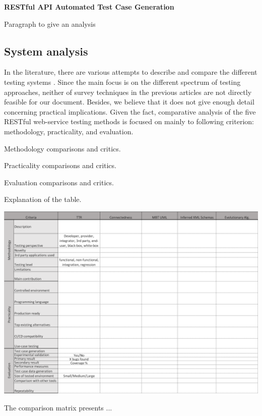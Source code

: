 \documentclass[english]{tktltiki}
\begin{document}
\textbf{RESTful API Automated Test Case Generation \cite{arcuri2017restful}}

Paragraph to give an analysis

\subsection{System analysis}
In the literature, there are various attempts to describe and compare the different testing systems \cite{canfora2006testing, canfora2009service, bozkurt2013testing}. Since the main focus is on the different spectrum of testing approaches, neither of survey techniques in the previous articles are not directly feasible for our document. Besides, we believe that it does not give enough detail concerning practical implications. Given the fact, comparative analysis of the five RESTful web-service testing methods is focused on mainly to following criterion: methodology, practicality, and evaluation.

Methodology comparisons and critics.

Practicality comparisons and critics.

Evaluation comparisons and critics.

Explanation of the table.

\begin{table}[h]
	\begin{center}
		\hspace*{-1.25cm}
		\includegraphics[width=1.1\textwidth]{images/comparison.png}
		\caption{The comparison matrix presents ...}
		\label{table:comparison}
	\end{center}
\end{table}
\end{document}
